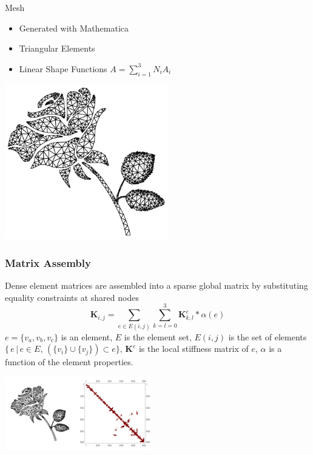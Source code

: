\documentclass{beamer}
\begin{document}
    \begin{frame}{Mesh}
        \begin{itemize}
            \item Generated with Mathematica
            \item Triangular Elements
            \item Linear Shape Functions
            $A=\sum_{i=1}^{3}N_{i}A_i$
        \end{itemize}
        \begin{center}
            \includegraphics[width=2.8in]{rosemesh.pdf}
        \end{center}
    \end{frame}
    \begin{frame}[fragile]
        \frametitle{Matrix Assembly}
        Dense element matrices are assembled into a sparse global matrix by substituting equality constraints at shared nodes
        \[\mathbf{K}_{i,j}=\sum_{e\in E(i,j)}\sum_{k=l=0}^{3} \mathbf{K}^{e}_{k,l}*\alpha(e)\]
        $e=\{v_a,v_b,v_c\}$ is an element, $E$ is the element set, $E(i,j)$ is the set of elements $\{\,e\,|\,e\in E,\,\left(\{v_i\}\cup\{v_j\}\right)\subset e\}$, $\mathbf{K}^{e}$ is the local stiffness matrix of $e$, $\alpha$ is a function of the element properties.\\
        \begin{center}
            \includegraphics[width=2.5in]{meshmatrix.png}
        \end{center}
    \end{frame}
\end{document}

